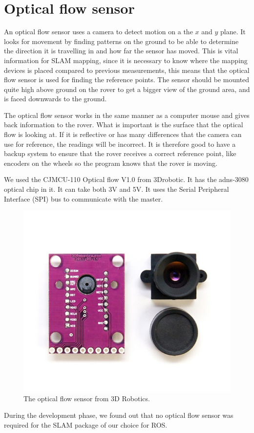 \clearpage
\section{Optical flow sensor}

An optical flow sensor uses a camera to detect motion on a the $x$ and $y$ plane. It looks for movement by finding patterns on the ground to be able to determine the direction it is travelling in and how far the sensor has moved. This is vital information for SLAM mapping, since it is necessary to know where the mapping devices is placed compared to previous measurements, this means that the optical flow sensor is used for finding the reference points. The sensor should be mounted quite high above ground on the rover to get a bigger view of the ground area, and is faced downwards to the ground\cite{opti_using}.

The optical flow sensor works in the same manner as a computer mouse and gives back information to the rover. What is important is the surface that the optical flow is looking at. If it is reflective or has many differences that the camera can use for reference, the readings will be incorrect. It is therefore good to have a backup system to ensure that the rover receives a correct reference point, like encoders on the wheels so the program knows that the rover is moving.

We used the CJMCU-110 Optical flow V1.0 from 3Drobotic. It has the adns-3080 optical chip in it. It can take both 3V and 5V. It uses the Serial Peripheral Interface (SPI) bus to communicate with the master\cite{opti_datasheet}.

\begin{figure}[H]
	\centering
	\includegraphics[width=.3\linewidth]{images/optical.jpg}
	\caption{The optical flow sensor from 3D Robotics.}
\end{figure}

During the development phase, we found out that no optical flow sensor was required for the SLAM package of our choice for ROS.